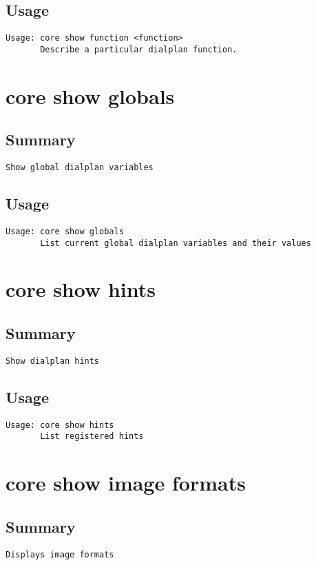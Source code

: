 \subsection{Usage}
\begin{verbatim}
Usage: core show function <function>
       Describe a particular dialplan function.

\end{verbatim}


\section{core show globals}
\subsection{Summary}
\begin{verbatim}
Show global dialplan variables
\end{verbatim}
\subsection{Usage}
\begin{verbatim}
Usage: core show globals
       List current global dialplan variables and their values

\end{verbatim}


\section{core show hints}
\subsection{Summary}
\begin{verbatim}
Show dialplan hints
\end{verbatim}
\subsection{Usage}
\begin{verbatim}
Usage: core show hints
       List registered hints

\end{verbatim}


\section{core show image formats}
\subsection{Summary}
\begin{verbatim}
Displays image formats
\end{verbatim}
